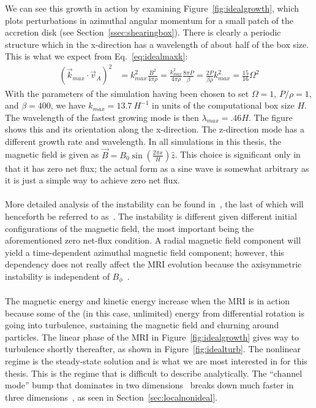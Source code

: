 We can see this growth in action by examining Figure~\ref{fig:idealgrowth}, which plots perturbations in azimuthal angular momentum for a small patch of the accretion disk (see Section~\ref{ssec:shearingbox}). There is clearly a periodic structure which in the x-direction has a wavelength of about half of the box size. This is what we expect from Eq.~\ref{eq:idealmaxk}:
\begin{align*}
  (\vec k_{max}\cdot \vec v_A)^2&=k_{max}^2\frac{B^2}{4\pi\rho}=\frac{k_{max}^2}{4\pi\rho}\frac{8\pi P}{\beta}=\frac{2P}{\beta\rho}k_{max}^2=\frac{15}{16}\Omega^2
\end{align*}
With the parameters of the simulation having been chosen to set $\Omega=1$, $P/\rho=1$, and $\beta=400$, we have $k_{max}=13.7~H^{-1}$ in units of the computational box size $H$. The wavelength of the fastest growing mode is then $\lambda_{max}=.46H$. The figure shows this and its orientation along the x-direction. The z-direction mode has a different growth rate and wavelength. In all simulations in this thesis, the magnetic field is given as $\vec B=B_0\sin\left(\frac{2\pi x}H\right)\hat z$. This choice is significant only in that it has zero net flux; the actual form as a sine wave is somewhat arbitrary as it is just a simple way to achieve zero net flux.\\
\\
More detailed analysis of the instability can be found in~\citet{BH1991a,BH1991b,BH1991c,BH1998}, the last of which will henceforth be referred to as~. The instability is different given different initial configurations of the magnetic field, the most important being the aforementioned zero net-flux condition. A radial magnetic field component will yield a time-dependent azimuthal magnetic field component; however, this dependency does not really affect the MRI evolution because the axisymmetric instability is independent of $B_\phi$~\cite{BH1998}. \\
\\
The magnetic energy and kinetic energy increase when the MRI is in action because some of the (in this case, unlimited) energy from differential rotation is going into turbulence, sustaining the magnetic field and churning around particles. The linear phase of the MRI in Figure~\ref{fig:idealgrowth} gives way to turbulence shortly thereafter, as shown in Figure~\ref{fig:idealturb}. The nonlinear regime is the steady-state solution and is what we are most interested in for this thesis. This is the regime that is difficult to describe analytically. The ``channel mode'' bump that dominates in two dimensions~\cite{BH1991a} breaks down much faster in three dimensions~\cite{HGB1995,HGB1996}, as seen in Section~\ref{sec:localnonideal}.

